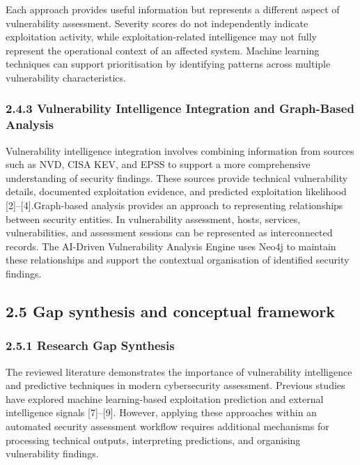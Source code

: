 \documentclass[
]{article}
\begin{document}
Each approach provides useful information but represents a different
aspect of vulnerability assessment. Severity scores do not independently
indicate exploitation activity, while exploitation-related intelligence
may not fully represent the operational context of an affected system.
Machine learning techniques can support prioritisation by identifying
patterns across multiple vulnerability characteristics.

\hypertarget{vulnerability-intelligence-integration-and-graph-based-analysis}{%
\subsubsection{2.4.3 Vulnerability Intelligence Integration and
Graph-Based
Analysis}\label{vulnerability-intelligence-integration-and-graph-based-analysis}}

Vulnerability intelligence integration involves combining information
from sources such as NVD, CISA KEV, and EPSS to support a more
comprehensive understanding of security findings. These sources provide
technical vulnerability details, documented exploitation evidence, and
predicted exploitation likelihood {[}2{]}--{[}4{]}.Graph-based analysis
provides an approach to representing relationships between security
entities. In vulnerability assessment, hosts, services, vulnerabilities,
and assessment sessions can be represented as interconnected records.
The AI-Driven Vulnerability Analysis Engine uses Neo4j to maintain these
relationships and support the contextual organisation of identified
security findings.

\hypertarget{gap-synthesis-and-conceptual-framework}{%
\subsection{2.5 Gap synthesis and conceptual
framework}\label{gap-synthesis-and-conceptual-framework}}

\hypertarget{research-gap-synthesis}{%
\subsubsection{2.5.1 Research Gap
Synthesis}\label{research-gap-synthesis}}

The reviewed literature demonstrates the importance of vulnerability
intelligence and predictive techniques in modern cybersecurity
assessment. Previous studies have explored machine learning-based
exploitation prediction and external intelligence signals
{[}7{]}--{[}9{]}. However, applying these approaches within an automated
security assessment workflow requires additional mechanisms for
processing technical outputs, interpreting predictions, and organising
vulnerability findings.
\end{document}
